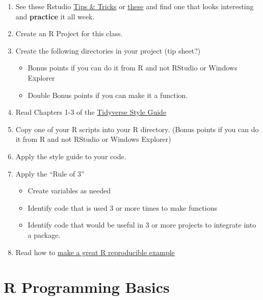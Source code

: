 \documentclass[]{book}
\providecommand{\tightlist}{%
  \setlength{\itemsep}{0pt}\setlength{\parskip}{0pt}}
\theoremstyle{definition}
\theoremstyle{definition}
\theoremstyle{definition}
\theoremstyle{remark}
\begin{document}
\begin{enumerate}
\def\labelenumi{\arabic{enumi}.}
\tightlist
\item
  See these Rstudio
  \href{https://rviews.rstudio.com/categories/tips-and-tricks/}{Tips \&
  Tricks} or \href{https://twitter.com/rstudiotips}{these} and find one
  that looks interesting and \textbf{practice} it all week.
\item
  Create an R Project for this class.
\item
  Create the following directories in your project (tip sheet?)

  \begin{itemize}
  \tightlist
  \item
    Bonus points if you can do it from R and not RStudio or Windows
    Explorer
  \item
    Double Bonus points if you can make it a function.
  \end{itemize}
\item
  Read Chapters 1-3 of the
  \href{http://style.tidyverse.org/index.html}{Tidyverse Style Guide}
\item
  Copy one of your R scripts into your R directory. (Bonus points if you
  can do it from R and not RStudio or Windows Explorer)
\item
  Apply the style guide to your code.\\
\item
  Apply the ``Rule of 3''

  \begin{itemize}
  \tightlist
  \item
    Create variables as needed
  \item
    Identify code that is used 3 or more times to make functions
  \item
    Identify code that would be useful in 3 or more projects to
    integrate into a package.
  \end{itemize}
\item
  Read how to
  \href{https://stackoverflow.com/questions/5963269/how-to-make-a-great-r-reproducible-example}{make
  a great R reproducible example}
\end{enumerate}

\chapter{R Programming Basics}\label{r-programming-basics}


\end{document}

